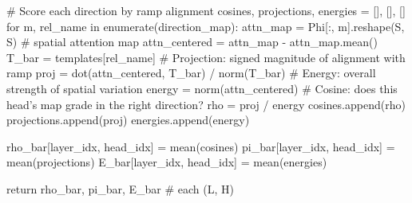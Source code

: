 \begin{RoundedListing}
            # Score each direction by ramp alignment
            cosines, projections, energies = [], [], []
            for m, rel_name in enumerate(direction_map):
                attn_map = Phi[:, m].reshape(S, S)      # spatial attention map
                attn_centered = attn_map - attn_map.mean()
                T_bar = templates[rel_name]
                # Projection: signed magnitude of alignment with ramp
                proj = dot(attn_centered, T_bar) / norm(T_bar)
                # Energy: overall strength of spatial variation
                energy = norm(attn_centered)
                # Cosine: does this head's map grade in the right direction?
                rho = proj / energy
                cosines.append(rho)
                projections.append(proj)
                energies.append(energy)

            rho_bar[layer_idx, head_idx] = mean(cosines)
            pi_bar[layer_idx, head_idx]  = mean(projections)
            E_bar[layer_idx, head_idx]   = mean(energies)

    return rho_bar, pi_bar, E_bar  # each (L, H)
\end{RoundedListing}
